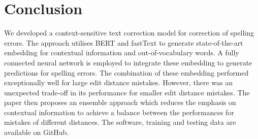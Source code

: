 \documentclass[11pt,a4paper]{article}
\begin{document}
\section{Conclusion}
We developed a context-sensitive text correction model for correction of spelling errors. The approach utilises BERT and fastText to generate state-of-the-art embedding for contextual information and out-of-vocabulary words. A fully connected neural network is employed to integrate these embedding to generate predictions for spelling errors. The combination of these embedding performed exceptionally well for large edit distance mistakes. However, there was an unexpected trade-off in its performance for smaller edit distance mistakes. The paper then proposes an ensemble approach which reduces the emphasis on contextual information to achieve a balance between the performances for mistakes of different distances. The software, training and testing data are available on GitHub.




\end{document}
